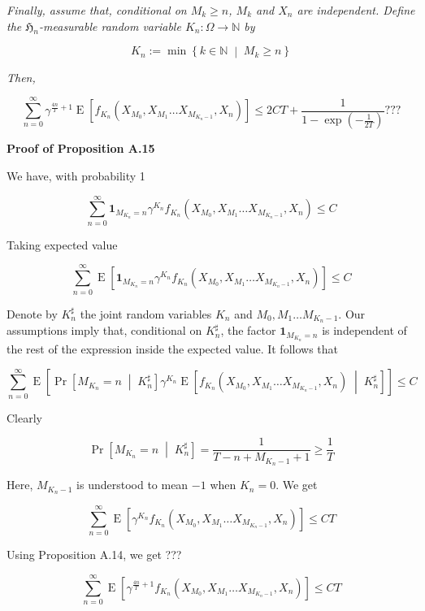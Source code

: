 \documentclass[a4paper]{article}
\newcommand{\Co}[1]{}
\newcommand{\AP}[1]{\left(#1\right)}
\newcommand{\AB}[1]{\left[#1\right]}
\newcommand{\ABM}[2]{\left[#1\;\middle\vert\;#2\right]}
\newcommand{\ACM}[2]{\left\{#1\;\middle\vert\;#2\right\}}
\newcommand{\CP}[3]{\underset{#1}{\operatorname{Pr}}\ABM{#2}{#3}}
\newcommand{\Ea}[2]{\underset{#1}{\operatorname{E}}\AB{#2}}
\newcommand{\CE}[3]{\underset{#1}{\operatorname{E}}\ABM{#2}{#3}}
\newcommand{\Nats}{\mathbb{N}}
\newcommand{\KD}[1]{\boldsymbol{1}_{#1}}
\newcommand{\Fi}{\mathfrak{H}}
\begin{document}
\textit{Finally, assume that, conditional on $M_k\geq n$, $M_k$ and $X_{n}$ are independent. Define the $\Fi_n$-measurable random variable $K_n:\Omega\rightarrow\Nats$ by}\Co{i}

$$K_n:=\min\ACM{k\in\Nats}{M_k\geq n}$$

\textit{Then,}\Co{i}

$$\sum_{n=0}^\infty\gamma^{\frac{4n}{T}+1}\Ea{}{f_{K_n}\AP{X_{M_0},X_{M_1}\ldots X_{M_{K_n-1}},X_n}}\leq 2CT+\frac{1}{1-\exp\AP{-\frac{1}{2T}}}???$$

\textbf{Proof of Proposition A.15}\Co{b}

We have, with probability 1

$$\sum_{n=0}^\infty\KD{M_{K_n}=n}\gamma^{K_n}f_{K_n}\AP{X_{M_0},X_{M_1}\ldots X_{M_{K_n-1}},X_n} \leq C$$

Taking expected value

$$\sum_{n=0}^\infty\Ea{}{\KD{M_{K_n}=n}\gamma^{K_n}f_{K_n}\AP{X_{M_0},X_{M_1}\ldots X_{M_{K_n-1}},X_n}} \leq C$$

Denote by $K_n^\sharp$ the joint random variables $K_n$ and $M_0,M_1\ldots M_{K_n-1}$. Our assumptions imply that, conditional on $K_n^\sharp$, the factor $\KD{M_{K_n}=n}$ is independent of the rest of the expression inside the expected value. It follows that

$$\sum_{n=0}^\infty\Ea{}{\CP{}{M_{K_n}=n}{K_n^\sharp}\gamma^{K_n}\CE{}{f_{K_n}\AP{X_{M_0},X_{M_1}\ldots X_{M_{K_n-1}},X_n}}{K_n^\sharp}} \leq C$$

Clearly

$$\CP{}{M_{K_n}=n}{K_n^\sharp}=\frac{1}{T-n+M_{K_n-1}+1}\geq\frac{1}{T}$$

Here, $M_{K_n-1}$ is understood to mean $-1$ when $K_n=0$. We get

$$\sum_{n=0}^\infty\Ea{}{\gamma^{K_n}f_{K_n}\AP{X_{M_0},X_{M_1}\ldots X_{M_{K_n-1}},X_n}} \leq CT$$

Using Proposition A.14, we get ???


$$\sum_{n=0}^\infty\Ea{}{\gamma^{\frac{4n}{T}+1}f_{K_n}\AP{X_{M_0},X_{M_1}\ldots X_{M_{K_n-1}},X_n}} \leq CT$$
\end{document}
